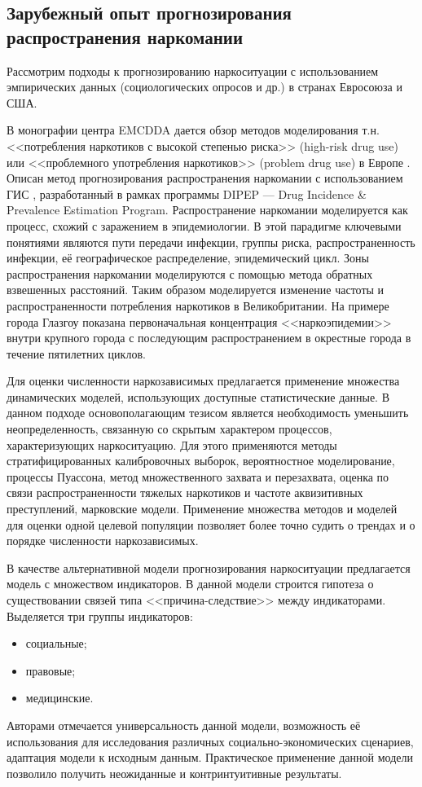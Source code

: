 \subsection{Зарубежный опыт прогнозирования распространения наркомании}

Рассмотрим подходы к прогнозированию наркоситуации с использованием эмпирических
данных (социологических опросов и др.) в странах Евросоюза и США.

В монографии центра EMCDDA дается обзор методов моделирования т.н. <<потребления
наркотиков с высокой степенью риска>> (high-risk drug use) или <<проблемного
употребления наркотиков>> (problem drug use) в Европе \cite{EMCDDA2001}. Описан
метод прогнозирования распространения наркомании с использованием ГИС
\cite{EMCDDA2001,Wiessing1999}, разработанный в рамках программы DIPEP --- Drug
Incidence \& Prevalence Estimation Program. Распространение наркомании
моделируется как процесс, схожий с заражением в эпидемиологии. В этой парадигме
ключевыми понятиями являются пути передачи инфекции, группы риска,
распространенность инфекции, её географическое распределение, эпидемический
цикл. Зоны распространения наркомании моделируются с помощью метода обратных
взвешенных расстояний. Таким образом моделируется изменение частоты и
распространенности потребления наркотиков в Великобритании.  На примере города
Глазгоу показана первоначальная концентрация <<наркоэпидемии>> внутри крупного
города с последующим распространением в окрестные города в течение пятилетних
циклов. 

Для оценки численности наркозависимых предлагается применение множества
динамических моделей, использующих доступные статистические данные. В данном
подходе основополагающим тезисом является необходимость уменьшить
неопределенность, связанную со скрытым характером процессов, характеризующих
наркоситуацию. Для этого применяются методы стратифицированных калибровочных
выборок, вероятностное моделирование, процессы Пуассона, метод множественного
захвата и перезахвата, оценка по связи распространенности тяжелых наркотиков и
частоте аквизитивных преступлений, марковские модели. Применение множества
методов и моделей для оценки одной целевой популяции позволяет более точно
судить о трендах и о порядке численности наркозависимых. 

В качестве альтернативной модели прогнозирования наркоситуации предлагается
модель с множеством индикаторов. В данной модели строится гипотеза о
существовании связей типа <<причина-следствие>> между индикаторами. Выделяется
три группы индикаторов: 
\begin{itemize}
    \item социальные;
    \item правовые;
    \item медицинские.
\end{itemize}
Авторами отмечается универсальность данной модели, возможность её использования
для исследования различных социально-экономических сценариев, адаптация модели к
исходным данным. Практическое применение данной модели позволило получить
неожиданные и контринтуитивные результаты. 

